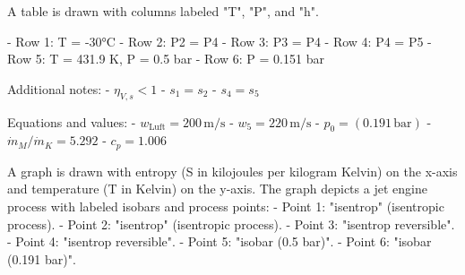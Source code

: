 A table is drawn with columns labeled "T", "P", and "h".  

- Row 1: T = -30°C  
- Row 2: P2 = P4  
- Row 3: P3 = P4  
- Row 4: P4 = P5  
- Row 5: T = 431.9 K, P = 0.5 bar  
- Row 6: P = 0.151 bar  

Additional notes:  
- \( \eta_{V,s} < 1 \)  
- \( s_1 = s_2 \)  
- \( s_4 = s_5 \)  

Equations and values:  
- \( w_{\text{Luft}} = 200 \, \text{m/s} \)  
- \( w_5 = 220 \, \text{m/s} \)  
- \( p_0 = (0.191 \, \text{bar}) \)  
- \( \dot{m}_M / \dot{m}_K = 5.292 \)  
- \( c_p = 1.006 \)

A graph is drawn with entropy (S in kilojoules per kilogram Kelvin) on the x-axis and temperature (T in Kelvin) on the y-axis. The graph depicts a jet engine process with labeled isobars and process points:  
- Point 1: "isentrop" (isentropic process).  
- Point 2: "isentrop" (isentropic process).  
- Point 3: "isentrop reversible".  
- Point 4: "isentrop reversible".  
- Point 5: "isobar (0.5 bar)".  
- Point 6: "isobar (0.191 bar)".